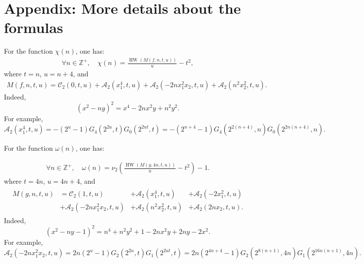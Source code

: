 \documentclass[10pt]{article}
\theoremstyle{plain}
\newcommand{\CTerm}{\mathcal{C}}
\newcommand{\HW}{\operatorname{HW}}
\newcommand{\Z}{\mathbb{Z}}
\begin{document}
\section{Appendix: More details about the formulas}\label{sectionmoredetails}

For the function $\chi(n)$, one has:
\begin{align*}
\forall n \in \Z^+, \quad \chi(n) = \frac{\HW(M(f, n, t, u))}{u} - t^2 ,
\end{align*}
where  $t = n$, $u = n+4$, and
\begin{align*}
M(f, n, t, u) = \mathcal{C}_2(0, t, u)
+ \mathcal{A}_2(x_1^4, t, u)
+ \mathcal{A}_2(-2n x_1^2 x_2, t, u)
+ \mathcal{A}_2(n^2 x_2^2, t, u) .
\end{align*}
Indeed,
$$(x^2 - ny)^2 = x^4 - 2n x^2y + n^2y^2.$$
For example,
$$ \mathcal{A}_2(x_1^4, t, u) = - (2^u-1)G_4(2^{2u}, t) G_0(2^{2ut},t) = - (2^{n+4} -1)
G_4(2^{2(n+4)}, n) G_0(2^{2n(n+4)}, n).$$

For the function $\omega(n)$, one has:

\begin{align*}
\forall n \in \Z^+, \quad
\omega(n) = \nu_2\left( \frac{\HW(M(g, 4n, t, u))}{u} - t^2 \right) - 1 .
\end{align*}
where $t=4n$, $u = 4n+4$, and
\begin{align} \label{TermM}
\begin{array}{llll}
M(g, n, t, u)
&= \CTerm_2(1, t, u)
&+ \mathcal{A}_2(x_1^4, t, u)
&+ \mathcal{A}_2(-2 x_1^2, t, u) \\
&+ \mathcal{A}_2(-2n x_1^2 x_2, t, u)
&+ \mathcal{A}_2(n^2 x_2^2, t, u)
&+ \mathcal{A}_2(2n x_2, t, u) .
\end{array}
\end{align}
Indeed,
$$(x^2 - ny - 1)^2 = n^4 + n^2y^2 + 1 -2nx^2y +2ny -2x^2.$$
For example,
$$\mathcal{A}_2(-2n x_1^2 x_2, t, u) = 2n (2^u -1)
G_2(2^{2u}, t) G_1(2^{2ut},t) = 2n (2^{4n+4} - 1) G_2(2^{8(n+1)}, 4n) G_1(2^{16n(n+1)},4n).$$
\end{document}
